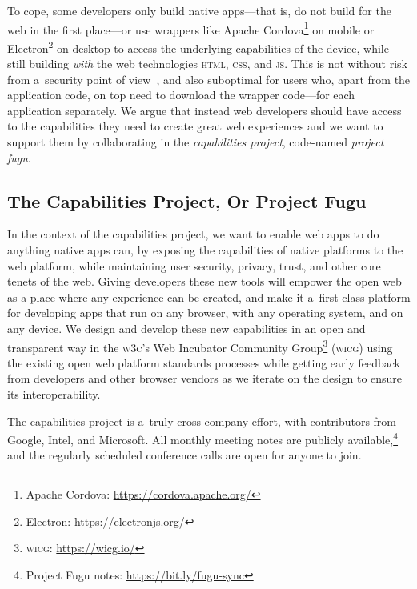 \documentclass[sigconf, anonymous]{acmart}
\begin{document}
To cope, some developers only build native apps---that is,
do not build for the web in the first place---or
use wrappers like Apache Cordova\footnote{Apache Cordova: \url{https://cordova.apache.org/}}
on mobile or Electron\footnote{Electron: \url{https://electronjs.org/}} on desktop
to access the underlying capabilities of the device,
while still building \textit{with} the web technologies
\textsc{html}, \textsc{css}, and \textsc{js}.
This is not without risk from a~security point of view~\cite{carettoni17,luo11},
and also suboptimal for users who, apart from the application code,
on top need to download the wrapper code---for each application separately.
We argue that instead web developers should have access
to the capabilities they need to create great web experiences
and we want to support them by collaborating in the \textit{capabilities project},
code-named \textit{project fugu}.

\subsection{The Capabilities Project, Or Project Fugu}

In the context of the capabilities project, we want to enable web apps
to do anything native apps can, by exposing the capabilities of native platforms
to the web platform, while maintaining user security, privacy, trust,
and other core tenets of the web.
Giving developers these new tools will empower the open web
as a place where any experience can be created,
and make it a~first class platform for developing apps that run on any browser,
with any operating system, and on any device.
We design and develop these new capabilities in an open and transparent way
in the \textsc{w3c}'s Web Incubator Community
Group\footnote{\textsc{wicg}: \url{https://wicg.io/}} (\textsc{wicg})
using the existing open web platform standards processes
while getting early feedback from developers and other browser vendors
as we iterate on the design to ensure its interoperability.

The capabilities project is a~truly cross-company effort,
with contributors from Google, Intel, and Microsoft.
All monthly meeting notes are publicly
available,\footnote{Project Fugu notes: \url{https://bit.ly/fugu-sync}}
and the regularly scheduled conference calls are open for anyone to join.
\end{document}
